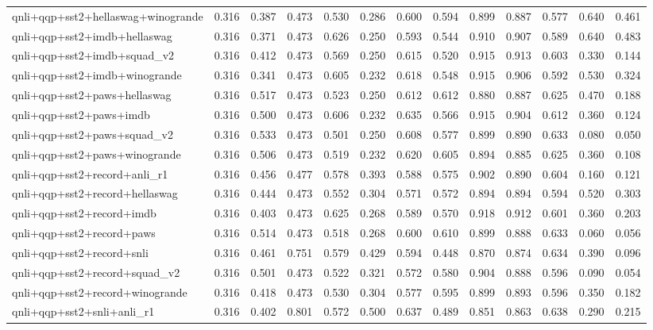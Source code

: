\begin{table}[t]
\begin{tabular}{lrrrrrrrrrrrr}
    qnli+qqp+sst2+hellaswag+winogrande & 0.316 & 0.387 & 0.473 & 0.530 & 0.286 & 0.600 & 0.594 & 0.899 & 0.887 & 0.577 & 0.640 & 0.461 \\
    qnli+qqp+sst2+imdb+hellaswag & 0.316 & 0.371 & 0.473 & 0.626 & 0.250 & 0.593 & 0.544 & 0.910 & 0.907 & 0.589 & 0.640 & 0.483 \\
    qnli+qqp+sst2+imdb+squad\_v2 & 0.316 & 0.412 & 0.473 & 0.569 & 0.250 & 0.615 & 0.520 & 0.915 & 0.913 & 0.603 & 0.330 & 0.144 \\
    qnli+qqp+sst2+imdb+winogrande & 0.316 & 0.341 & 0.473 & 0.605 & 0.232 & 0.618 & 0.548 & 0.915 & 0.906 & 0.592 & 0.530 & 0.324 \\
    qnli+qqp+sst2+paws+hellaswag & 0.316 & 0.517 & 0.473 & 0.523 & 0.250 & 0.612 & 0.612 & 0.880 & 0.887 & 0.625 & 0.470 & 0.188 \\
    qnli+qqp+sst2+paws+imdb & 0.316 & 0.500 & 0.473 & 0.606 & 0.232 & 0.635 & 0.566 & 0.915 & 0.904 & 0.612 & 0.360 & 0.124 \\
    qnli+qqp+sst2+paws+squad\_v2 & 0.316 & 0.533 & 0.473 & 0.501 & 0.250 & 0.608 & 0.577 & 0.899 & 0.890 & 0.633 & 0.080 & 0.050 \\
    qnli+qqp+sst2+paws+winogrande & 0.316 & 0.506 & 0.473 & 0.519 & 0.232 & 0.620 & 0.605 & 0.894 & 0.885 & 0.625 & 0.360 & 0.108 \\
    qnli+qqp+sst2+record+anli\_r1 & 0.316 & 0.456 & 0.477 & 0.578 & 0.393 & 0.588 & 0.575 & 0.902 & 0.890 & 0.604 & 0.160 & 0.121 \\
    qnli+qqp+sst2+record+hellaswag & 0.316 & 0.444 & 0.473 & 0.552 & 0.304 & 0.571 & 0.572 & 0.894 & 0.894 & 0.594 & 0.520 & 0.303 \\
    qnli+qqp+sst2+record+imdb & 0.316 & 0.403 & 0.473 & 0.625 & 0.268 & 0.589 & 0.570 & 0.918 & 0.912 & 0.601 & 0.360 & 0.203 \\
    qnli+qqp+sst2+record+paws & 0.316 & 0.514 & 0.473 & 0.518 & 0.268 & 0.600 & 0.610 & 0.899 & 0.888 & 0.633 & 0.060 & 0.056 \\
    qnli+qqp+sst2+record+snli & 0.316 & 0.461 & 0.751 & 0.579 & 0.429 & 0.594 & 0.448 & 0.870 & 0.874 & 0.634 & 0.390 & 0.096 \\
    qnli+qqp+sst2+record+squad\_v2 & 0.316 & 0.501 & 0.473 & 0.522 & 0.321 & 0.572 & 0.580 & 0.904 & 0.888 & 0.596 & 0.090 & 0.054 \\
    qnli+qqp+sst2+record+winogrande & 0.316 & 0.418 & 0.473 & 0.530 & 0.304 & 0.577 & 0.595 & 0.899 & 0.893 & 0.596 & 0.350 & 0.182 \\
    qnli+qqp+sst2+snli+anli\_r1 & 0.316 & 0.402 & 0.801 & 0.572 & 0.500 & 0.637 & 0.489 & 0.851 & 0.863 & 0.638 & 0.290 & 0.215 \\

\end{tabular}
\end{table}
